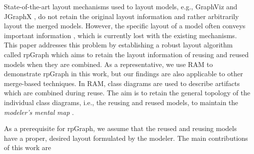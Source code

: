 State-of-the-art layout mechanisms used to layout models, e.g., GraphViz \cite{graphviz} and JGraphX \cite{JgraphX}, do not retain the original layout information and rather arbitrarily layout the merged models. However, the specific layout of a model often conveys important information \cite{misue1995layout}, which is currently lost with the existing mechanisms. This paper addresses this problem by establishing a robust layout algorithm called rpGraph which aims to retain the layout information of reusing and reused models when they are combined. As a representative, we use RAM to demonstrate rpGraph in this work, but our findings are also applicable to other merge-based techniques. In RAM, class diagrams are used to describe artifacts which are combined during reuse. The aim is to retain the general topology of the individual class diagrams, i.e., the reusing and reused models, to maintain the \textit{modeler's mental map} \cite{misue1995layout,von2007mental}.

As a prerequisite for rpGraph, we assume that the reused and reusing models have a proper, desired layout formulated by the modeler. The main contributions of this work are\haAction{:} 
   
